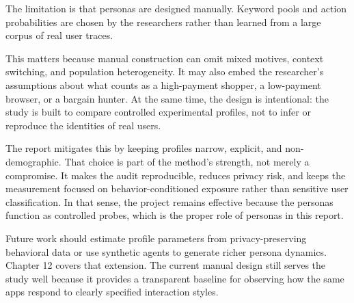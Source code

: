 The limitation is that personas are designed manually. Keyword pools and action probabilities are chosen by the researchers rather than learned from a large corpus of real user traces.

This matters because manual construction can omit mixed motives, context switching, and population heterogeneity. It may also embed the researcher's assumptions about what counts as a high-payment shopper, a low-payment browser, or a bargain hunter. At the same time, the design is intentional: the study is built to compare controlled experimental profiles, not to infer or reproduce the identities of real users.

The report mitigates this by keeping profiles narrow, explicit, and non-demographic. That choice is part of the method's strength, not merely a compromise. It makes the audit reproducible, reduces privacy risk, and keeps the measurement focused on behavior-conditioned exposure rather than sensitive user classification. In that sense, the project remains effective because the personas function as controlled probes, which is the proper role of personas in this report.

Future work should estimate profile parameters from privacy-preserving behavioral data or use synthetic agents to generate richer persona dynamics. Chapter 12 covers that extension. The current manual design still serves the study well because it provides a transparent baseline for observing how the same apps respond to clearly specified interaction styles.
